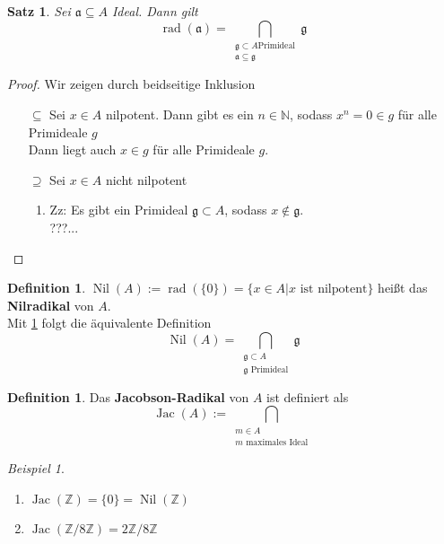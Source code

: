 \documentclass[10pt,a4paper]{article}
\newcommand{\N}{\ensuremath{\mathbb{N}}}
\newcommand{\Z}{\ensuremath{\mathbb{Z}}}
\newcommand{\Nil}{\ensuremath{\operatorname{Nil}}}
\newcommand{\rad}{\ensuremath{\operatorname{rad}}}
\newcommand{\Jac}{\ensuremath{\operatorname{Jac}}}
\newcounter{thm}[section]
\theoremstyle{definition}
\newtheorem{definition}[thm]{Definition}
\theoremstyle{plain}
\newtheorem{satz}[thm]{Satz}
\theoremstyle{remark}
\newtheorem*{exm*}{Beispiel}
\begin{document}
\begin{satz}\label{115satz}
	Sei $\mathfrak a\subseteq A$ Ideal. Dann gilt 
	\[\rad(\mathfrak a)=\bigcap_{\substack{\mathfrak g\subset A\text{Primideal}\\\mathfrak a\subseteq \mathfrak g}} \mathfrak g\]
\end{satz}
\begin{proof}
	Wir zeigen durch beidseitige Inklusion
	\begin{itemize}
		\item [$\subseteq$] Sei $x\in A$ nilpotent. Dann gibt es ein $n\in\N$, sodass $x^n=0\in g$ für alle Primideale $g$\\
		Dann liegt auch $x\in g$ für alle Primideale $g$.
		\item [$\supseteq$] Sei $x\in A$ nicht nilpotent
		\begin{enumerate}
			\item Zz: Es gibt ein Primideal $\mathfrak g\subset A$, sodass $x\notin \mathfrak g$.\\
			???...
		\end{enumerate}
	\end{itemize}
\end{proof}

\begin{definition}
	$\Nil(A):=\rad(\{0\})=\{x\in A|\text{$x$ ist nilpotent}\}$ heißt das \textbf{Nilradikal} von $A$.\\
	Mit \ref{115satz} folgt die äquivalente Definition
	\[\Nil(A)=\bigcap_{\substack{\mathfrak g\subset A\\\text{$\mathfrak g$ Primideal}}}\mathfrak g\]
\end{definition}


\begin{definition}
	Das \textbf{Jacobson-Radikal} von $A$ ist definiert als
	\[\Jac(A):=\bigcap_{\substack{m\in A\\\text{$m$ maximales Ideal}}}\]
\end{definition}
\begin{exm*}
	\begin{enumerate}
		\item $\Jac(\Z)=\{0\}=\Nil(\Z)$
		\item $\Jac(\Z/8\Z)=2\Z/8\Z$
	\end{enumerate}
\end{exm*}
\end{document}
